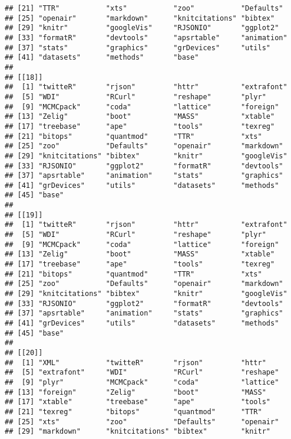\begin{knitrout}
\begin{kframe}
\begin{verbatim}
## [21] "TTR"           "xts"           "zoo"           "Defaults"     
## [25] "openair"       "markdown"      "knitcitations" "bibtex"       
## [29] "knitr"         "googleVis"     "RJSONIO"       "ggplot2"      
## [33] "formatR"       "devtools"      "apsrtable"     "animation"    
## [37] "stats"         "graphics"      "grDevices"     "utils"        
## [41] "datasets"      "methods"       "base"         
## 
## [[18]]
##  [1] "twitteR"       "rjson"         "httr"          "extrafont"    
##  [5] "WDI"           "RCurl"         "reshape"       "plyr"         
##  [9] "MCMCpack"      "coda"          "lattice"       "foreign"      
## [13] "Zelig"         "boot"          "MASS"          "xtable"       
## [17] "treebase"      "ape"           "tools"         "texreg"       
## [21] "bitops"        "quantmod"      "TTR"           "xts"          
## [25] "zoo"           "Defaults"      "openair"       "markdown"     
## [29] "knitcitations" "bibtex"        "knitr"         "googleVis"    
## [33] "RJSONIO"       "ggplot2"       "formatR"       "devtools"     
## [37] "apsrtable"     "animation"     "stats"         "graphics"     
## [41] "grDevices"     "utils"         "datasets"      "methods"      
## [45] "base"         
## 
## [[19]]
##  [1] "twitteR"       "rjson"         "httr"          "extrafont"    
##  [5] "WDI"           "RCurl"         "reshape"       "plyr"         
##  [9] "MCMCpack"      "coda"          "lattice"       "foreign"      
## [13] "Zelig"         "boot"          "MASS"          "xtable"       
## [17] "treebase"      "ape"           "tools"         "texreg"       
## [21] "bitops"        "quantmod"      "TTR"           "xts"          
## [25] "zoo"           "Defaults"      "openair"       "markdown"     
## [29] "knitcitations" "bibtex"        "knitr"         "googleVis"    
## [33] "RJSONIO"       "ggplot2"       "formatR"       "devtools"     
## [37] "apsrtable"     "animation"     "stats"         "graphics"     
## [41] "grDevices"     "utils"         "datasets"      "methods"      
## [45] "base"         
## 
## [[20]]
##  [1] "XML"           "twitteR"       "rjson"         "httr"         
##  [5] "extrafont"     "WDI"           "RCurl"         "reshape"      
##  [9] "plyr"          "MCMCpack"      "coda"          "lattice"      
## [13] "foreign"       "Zelig"         "boot"          "MASS"         
## [17] "xtable"        "treebase"      "ape"           "tools"        
## [21] "texreg"        "bitops"        "quantmod"      "TTR"          
## [25] "xts"           "zoo"           "Defaults"      "openair"      
## [29] "markdown"      "knitcitations" "bibtex"        "knitr"        

\end{verbatim}
\end{kframe}
\end{knitrout}
